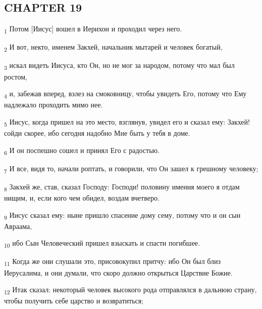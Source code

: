 \subsection{CHAPTER 19}
\begin{tcolorbox}
\textsubscript{1} Потом [Иисус] вошел в Иерихон и проходил через него.
\end{tcolorbox}
\begin{tcolorbox}
\textsubscript{2} И вот, некто, именем Закхей, начальник мытарей и человек богатый,
\end{tcolorbox}
\begin{tcolorbox}
\textsubscript{3} искал видеть Иисуса, кто Он, но не мог за народом, потому что мал был ростом,
\end{tcolorbox}
\begin{tcolorbox}
\textsubscript{4} и, забежав вперед, взлез на смоковницу, чтобы увидеть Его, потому что Ему надлежало проходить мимо нее.
\end{tcolorbox}
\begin{tcolorbox}
\textsubscript{5} Иисус, когда пришел на это место, взглянув, увидел его и сказал ему: Закхей! сойди скорее, ибо сегодня надобно Мне быть у тебя в доме.
\end{tcolorbox}
\begin{tcolorbox}
\textsubscript{6} И он поспешно сошел и принял Его с радостью.
\end{tcolorbox}
\begin{tcolorbox}
\textsubscript{7} И все, видя то, начали роптать, и говорили, что Он зашел к грешному человеку;
\end{tcolorbox}
\begin{tcolorbox}
\textsubscript{8} Закхей же, став, сказал Господу: Господи! половину имения моего я отдам нищим, и, если кого чем обидел, воздам вчетверо.
\end{tcolorbox}
\begin{tcolorbox}
\textsubscript{9} Иисус сказал ему: ныне пришло спасение дому сему, потому что и он сын Авраама,
\end{tcolorbox}
\begin{tcolorbox}
\textsubscript{10} ибо Сын Человеческий пришел взыскать и спасти погибшее.
\end{tcolorbox}
\begin{tcolorbox}
\textsubscript{11} Когда же они слушали это, присовокупил притчу: ибо Он был близ Иерусалима, и они думали, что скоро должно открыться Царствие Божие.
\end{tcolorbox}
\begin{tcolorbox}
\textsubscript{12} Итак сказал: некоторый человек высокого рода отправлялся в дальнюю страну, чтобы получить себе царство и возвратиться;
\end{tcolorbox}

